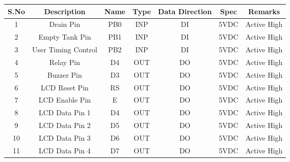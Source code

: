 \documentclass[12pt]{article}
\begin{document}
   \begin{tabular}{|c|c|c|c|c|c|c|}
  \hline
 \textbf{S.No }& \textbf{Description} & \textbf{Name}&\textbf{Type }& \textbf{Data Direction}  &\textbf{ Spec}& \textbf{Remarks} \\
  \hline
  1 & Drain Pin & PB0 & INP  & DI  &5VDC&Active High \\
  \hline
  2 & Empty Tank Pin  &PB1&INP  & DI  &5VDC&Active High \\
  \hline
  3 &  User Timing Control  & PB2 &INP &DI &5VDC&Active High \\
  \hline
  4 & Relay  Pin  & D4  &OUT & DO  & 5VDC&Active High \\
  \hline
  5&Buzzer Pin & D3 &OUT & DO  &5VDC&Active High\\
 \hline
  6 &LCD Reset Pin & RS &OUT &DO&5VDC&Active High \\
  \hline
  7 &LCD Enable Pin & E &OUT &DO &5VDC&Active High \\
  \hline
  8 &LCD Data Pin 1 & D4 &OUT &DO &5VDC&Active High \\
  \hline
  9 & LCD Data Pin 2& D5 &OUT & DO &5VDC&Active High \\
 \hline
  10 & LCD Data Pin 3 & D6 &OUT & DO &5VDC&Active High \\
  \hline
  11 &LCD Data Pin 4 & D7 &OUT& DO &5VDC&Active High \\
  \hline
\end{tabular}
 
\end{document}
